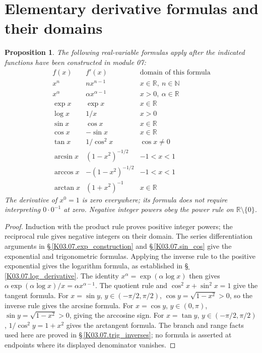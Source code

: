 \documentclass[11pt,oneside,a4paper]{book}
\newtheorem{proposition}[theorem]{Proposition}
\theoremstyle{definition}
\theoremstyle{remark}
\newcommand{\N}{\mathbb N}
\newcommand{\R}{\mathbb R}
\newcommand{\KEntry}[2]{\Needspace{7\baselineskip}\section{#2}\label{#1}{\small\sffamily\color{black!60}\detokenize{#1}}\par}
\newcommand{\KRef}[1]{\hyperref[#1]{\S\,\ref*{#1}}}
\begin{document}
\KEntry{K03.04.elementary_rules}{Elementary derivative formulas and their domains}
\begin{proposition}
The following real-variable formulas apply after the indicated functions have been constructed in module 07:
\[
\begin{array}{c|c|c}
 f(x)&f'(x)&\text{domain of this formula}\\\hline
 x^n&nx^{n-1}&x\in\R,\ n\in\N\\
 x^\alpha&\alpha x^{\alpha-1}&x>0,\ \alpha\in\R\\
 \exp x&\exp x&x\in\R\\
 \log x&1/x&x>0\\
 \sin x&\cos x&x\in\R\\
 \cos x&-\sin x&x\in\R\\
 \tan x&1/\cos^2x&\cos x\ne0\\
 \arcsin x&(1-x^2)^{-1/2}&-1<x<1\\
 \arccos x&-(1-x^2)^{-1/2}&-1<x<1\\
 \arctan x&(1+x^2)^{-1}&x\in\R
\end{array}
\]
The derivative of $x^0=1$ is zero everywhere; its formula does not require interpreting $0\cdot0^{-1}$ at zero. Negative integer powers obey the power rule on $\R\setminus\{0\}$.
\end{proposition}
\begin{proof}
Induction with the product rule proves positive integer powers; the reciprocal rule gives negative integers on their domain. The series differentiation arguments in \KRef{K03.07.exp_construction} and \KRef{K03.07.sin_cos} give the exponential and trigonometric formulas. Applying the inverse rule to the positive exponential gives the logarithm formula, as established in \KRef{K03.07.log_derivative}. The identity $x^\alpha=\exp(\alpha\log x)$ then gives $\alpha\exp(\alpha\log x)/x=\alpha x^{\alpha-1}$. The quotient rule and $\cos^2x+\sin^2x=1$ give the tangent formula. For $x=\sin y$, $y\in(-\pi/2,\pi/2)$, $\cos y=\sqrt{1-x^2}>0$, so the inverse rule gives the arcsine formula. For $x=\cos y$, $y\in(0,\pi)$, $\sin y=\sqrt{1-x^2}>0$, giving the arccosine sign. For $x=\tan y$, $y\in(-\pi/2,\pi/2)$, $1/\cos^2y=1+x^2$ gives the arctangent formula. The branch and range facts used here are proved in \KRef{K03.07.trig_inverses}; no formula is asserted at endpoints where its displayed denominator vanishes.
\end{proof}
\end{document}
